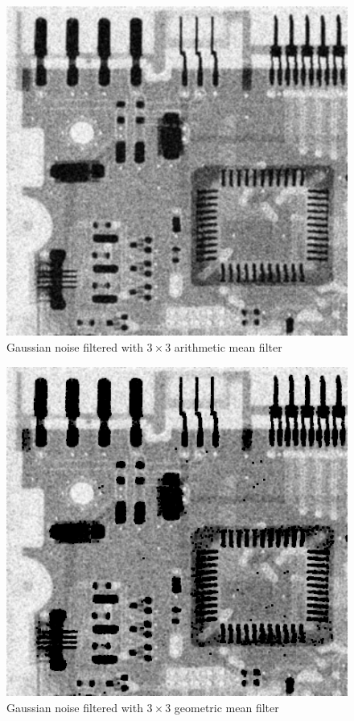 \documentclass{article}
\begin{document}
\begin{figure}[]
	\centering
	\includegraphics[width=336pt]{../result/task2/gauss/gauss-arithmetic.png}
	\caption{Gaussian noise filtered with $3 \times 3$ arithmetic mean filter}
	\label{fig:gaussam}
\end{figure}

\begin{figure}[]
	\centering
	\includegraphics[width=336pt]{../result/task2/gauss/gauss-geometric.png}
	\caption{Gaussian noise filtered with $3 \times 3$ geometric mean filter}
	\label{fig:gaussgm}
\end{figure}
\end{document}

